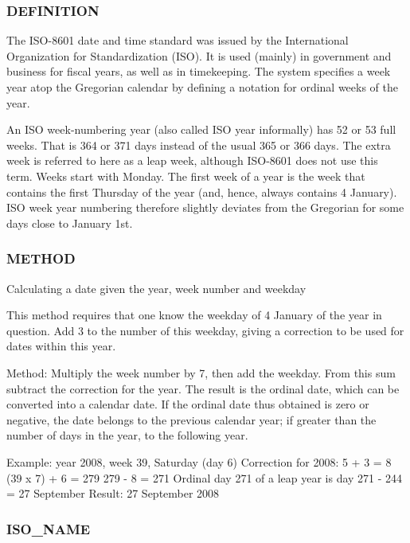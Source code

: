 \subsubsection*{D\+E\+F\+I\+N\+I\+T\+I\+ON}

The I\+S\+O-\/8601 date and time standard was issued by the International Organization for Standardization (I\+SO). It is used (mainly) in government and business for fiscal years, as well as in timekeeping. The system specifies a week year atop the Gregorian calendar by defining a notation for ordinal weeks of the year.

An I\+SO week-\/numbering year (also called I\+SO year informally) has 52 or 53 full weeks. That is 364 or 371 days instead of the usual 365 or 366 days. The extra week is referred to here as a leap week, although I\+S\+O-\/8601 does not use this term. Weeks start with Monday. The first week of a year is the week that contains the first Thursday of the year (and, hence, always contains 4 January). I\+SO week year numbering therefore slightly deviates from the Gregorian for some days close to January 1st.

\subsubsection*{M\+E\+T\+H\+OD}

Calculating a date given the year, week number and weekday

This method requires that one know the weekday of 4 January of the year in question. Add 3 to the number of this weekday, giving a correction to be used for dates within this year.

Method\+: Multiply the week number by 7, then add the weekday. From this sum subtract the correction for the year. The result is the ordinal date, which can be converted into a calendar date. If the ordinal date thus obtained is zero or negative, the date belongs to the previous calendar year; if greater than the number of days in the year, to the following year.

Example\+: year 2008, week 39, Saturday (day 6) Correction for 2008\+: 5 + 3 = 8 (39 x 7) + 6 = 279 279 -\/ 8 = 271 Ordinal day 271 of a leap year is day 271 -\/ 244 = 27 September Result\+: 27 September 2008

\subsubsection*{I\+S\+O\+\_\+\+N\+A\+ME}

